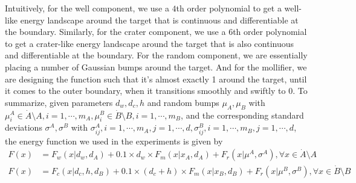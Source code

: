 \documentclass[english, aip, jcp, priprint, graphicx,floatfix]{revtex4-1}
\theoremstyle{plain}
\theoremstyle{definition}
\theoremstyle{plain}
\begin{document}
Intuitively, for the well component, we use a $4$th order polynomial to get a well-like energy landscape around the target that is continuous and differentiable at the boundary. Similarly, for the crater component, we use a $6$th order polynomial to get a crater-like energy landscape around the target that is also continuous and differentiable at the boundary. For the random component, we are essentially placing a number of Gaussian bumps around the target. And for the mollifier, we are designing the function such that it's almost exactly 1 around the target, until it comes to the outer boundary, when it transitions smoothly and swiftly to 0.
To summarize, given parameters $d_w, d_c, h$ and random bumps $\mu_{A}, \mu_{B}$ with $\mu^{A}_i\in \dot{A} \setminus A, i=1, \cdots, m_A, \mu^{B}_i \in \dot{B} \setminus B, i=1, \cdots, m_B$, and the corresponding standard deviations $\sigma^{A}, \sigma^{B}$ with $\sigma^{A}_{i j}, i=1,\cdots, m_A, j=1, \cdots, d, \sigma^{B}_{i j}, i=1, \cdots, m_B, j=1, \cdots, d$, the energy function we used in the experiments is given by
\begin{align}
F(x) &= F_w(x|d_w, d_A) + 0.1 \times d_w \times F_m(x|x_A, d_A) + F_r(x|\mu^{A}, \sigma^{A}), \forall x \in \dot{A} \setminus A \\
F(x) &= F_c(x|d_c, h, d_B) + 0.1 \times (d_c + h) \times F_m(x|x_B, d_B) + F_r(x|\mu^{B}, \sigma^{B}), \forall x \in \dot{B} \setminus B
\end{align}
\end{document}

